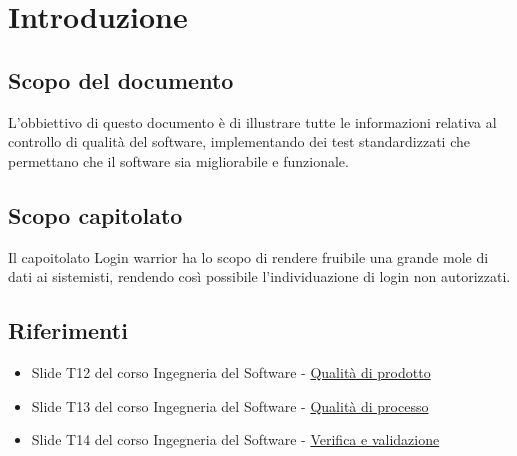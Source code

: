 \section{Introduzione}
\subsection{Scopo del documento}
L'obbiettivo di questo documento è di illustrare tutte le informazioni relativa al controllo di qualità del software, implementando dei test standardizzati che permettano che il software sia migliorabile e funzionale.
\subsection{Scopo capitolato}
Il capoitolato Login warrior ha lo scopo di rendere fruibile una grande mole di dati ai sistemisti, rendendo così possibile l'individuazione di login non autorizzati. %
\subsection{Riferimenti}
\begin{itemize}
    \item Slide T12 del corso Ingegneria del Software -  \href{https://www.math.unipd.it/~tullio/IS-1/2020/Dispense/L12.pdf}{Qualità di prodotto}
    \item Slide T13 del corso Ingegneria del Software - \href{https://www.math.unipd.it/~tullio/IS-1/2020/Dispense/L13.pdf}{Qualità di processo}  
    \item Slide T14 del corso Ingegneria del Software - \href{https://www.math.unipd.it/~tullio/IS-1/2020/Dispense/L14.pdf}{Verifica e validazione}
\end{itemize}
\newpage